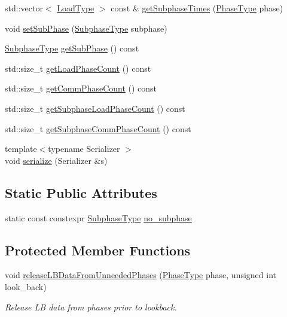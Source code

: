 \begin{DoxyCompactItemize}
\item 
std\+::vector$<$ \hyperlink{namespacevt_a8fb51741340b87d7aaee0bef60e9896b}{Load\+Type} $>$ const  \& \hyperlink{structvt_1_1elm_1_1_element_l_b_data_a60f723efc5e2ce332d3aeb7f72738306}{get\+Subphase\+Times} (\hyperlink{namespacevt_a46ce6733d5cdbd735d561b7b4029f6d7}{Phase\+Type} phase)
\item 
void \hyperlink{structvt_1_1elm_1_1_element_l_b_data_a93c02f4370d1622fefe6a63f0f360d96}{set\+Sub\+Phase} (\hyperlink{namespacevt_ae78cbfdf1e57470e33eedb074f2beeba}{Subphase\+Type} subphase)
\item 
\hyperlink{namespacevt_ae78cbfdf1e57470e33eedb074f2beeba}{Subphase\+Type} \hyperlink{structvt_1_1elm_1_1_element_l_b_data_a00c4afedbaa4b2cbebf877ea194297c3}{get\+Sub\+Phase} () const
\item 
std\+::size\+\_\+t \hyperlink{structvt_1_1elm_1_1_element_l_b_data_a2caf9adf8c33a1d2dda021388b84bb00}{get\+Load\+Phase\+Count} () const
\item 
std\+::size\+\_\+t \hyperlink{structvt_1_1elm_1_1_element_l_b_data_a5164aaf6b9aa619465454b7d24273f10}{get\+Comm\+Phase\+Count} () const
\item 
std\+::size\+\_\+t \hyperlink{structvt_1_1elm_1_1_element_l_b_data_ab8778cab537f8428281088d47c18eebc}{get\+Subphase\+Load\+Phase\+Count} () const
\item 
std\+::size\+\_\+t \hyperlink{structvt_1_1elm_1_1_element_l_b_data_ae042437f8dcaff5822b670b73b4e724b}{get\+Subphase\+Comm\+Phase\+Count} () const
\item 
{\footnotesize template$<$typename Serializer $>$ }\\void \hyperlink{structvt_1_1elm_1_1_element_l_b_data_a621cfc47dbcd0505e25d9060a78f080f}{serialize} (Serializer \&s)
\end{DoxyCompactItemize}
\subsection*{Static Public Attributes}
\begin{DoxyCompactItemize}
\item 
static const constexpr \hyperlink{namespacevt_ae78cbfdf1e57470e33eedb074f2beeba}{Subphase\+Type} \hyperlink{structvt_1_1elm_1_1_element_l_b_data_af93ba399701c539f3acbe75095e0d080}{no\+\_\+subphase}
\end{DoxyCompactItemize}
\subsection*{Protected Member Functions}
\begin{DoxyCompactItemize}
\item 
void \hyperlink{structvt_1_1elm_1_1_element_l_b_data_ad74e3a2d52dc65533df25846211c9aa4}{release\+L\+B\+Data\+From\+Unneeded\+Phases} (\hyperlink{namespacevt_a46ce6733d5cdbd735d561b7b4029f6d7}{Phase\+Type} phase, unsigned int look\+\_\+back)
\begin{DoxyCompactList}\small\item\em Release LB data from phases prior to lookback. \end{DoxyCompactList}\end{DoxyCompactItemize}
